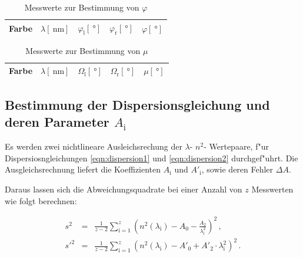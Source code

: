		\begin{table}[h!]
			\begin{center}
				\caption{Messwerte zur Bestimmung von $\varphi$ \label{table:phi}}
				\begin{tabular}{|c|c|c|c|c|}
					\hline
						Farbe & $\lambda [\SI{}{\nano \meter}]$ & $\varphi_\mathrm{l} [\SI{}{\degree}]$ & $\varphi_\mathrm{r} [\SI{}{\degree}]$ & $\varphi [\SI{}{\degree}]$ \\
					\hline 
					\hline
						
					\hline 
				\end{tabular}
			\end{center}
		\end{table}		

		\begin{table}[h!]
			\begin{center}
				\caption{Messwerte zur Bestimmung von $\mu$ \label{table:mu}}
				\begin{tabular}{|c|c|c|c|c|}
					\hline
						Farbe & $\lambda [\SI{}{\nano \meter}]$ & $\Omega_\mathrm{l} [\SI{}{\degree}]$ & $\Omega_\mathrm{r} [\SI{}{\degree}]$ & $\mu [\SI{}{\degree}]$ \\
					\hline 
					\hline
						
					\hline 
				\end{tabular}
			\end{center}
		\end{table}		

	\clearpage

	\subsection{Bestimmung der Dispersionsgleichung und deren Parameter $A_\mathrm{i}$}
	\label{subsec:dispersionskurve}
		Es werden zwei nichtlineare Ausleichsrechung der $\lambda$- $n^2$- Wertepaare, f"ur Dispersiosngleichungen \eqref{eqn:dispersion1} und \eqref{eqn:dispersion2} durchgef"uhrt.
		Die Ausgleichsrechnung liefert die Koeffizienten $A_\mathrm{i}$ und $A'_\mathrm{i}$, sowie deren Fehler $\Delta A$.

		Daraus lassen sich die Abweichungsquadrate bei einer Anzahl von $z$ Messwerten wie folgt berechnen:

		\begin{eqnarray*}
			s^2 & = & \frac{1}{z - 2} \sum_{\mathrm{i} = 1}^z{\left(n^2(\lambda_\mathrm{i}) - A_0 - \frac{A_2}{\lambda_\mathrm{i}^2}\right)^2} \,, \\
			s'^2 & = & \frac{1}{z - 2} \sum_{\mathrm{i} = 1}^z{\left(n^2(\lambda_\mathrm{i}) - A'_0 + A'_2 \cdot \lambda_\mathrm{i}^2 \right)^2} \,. \\
		\end{eqnarray*}

